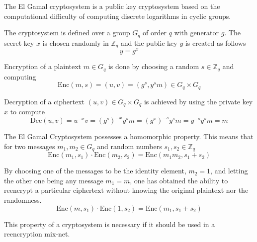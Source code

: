 The El Gamal cryptosystem is a public key cryptosystem based on the
computational difficulty of computing discrete logarithms in cyclic
groups. 

The cryptosystem is defined over a group $G_q$ of order $q$ with
generator $g$. The secret key $x$ is chosen randomly in $\mathbb{Z}_q$
and the public key $y$ is created as follows
$$
y = g^x
$$

Encryption of a plaintext $m \in G_q$ is done by choosing a random $s
\in \mathbb{Z}_q$ and computing
$$
\mathrm{Enc}(m,s) = (u,v) = (g^s, y^sm) \in G_q \times G_q
$$

Decryption of a ciphertext $(u,v) \in G_q \times G_q$ is achieved by
using the private key $x$ to compute
$$ 
\mathrm{Dec}(u,v) = u^{-x}v = (g^s)^{-x}y^sm = (g^x)^{-s}y^sm = y^{-s}y^sm = m
$$

The El Gamal Cryptosystem possesses a homomorphic property. This means
that for two messages $m_1,m_2 \in G_q$ and random numbers $s_1, s_2
\in \mathbb{Z}_q$
$$
\mathrm{Enc}(m_1,s_1) \cdot \mathrm{Enc}(m_2,s_2) = \mathrm{Enc}(m_1m_2,s_1 + s_2)
$$

By choosing one of the messages to be the identity element, $m_2 = 1$,
and letting the other one being any message $m_1 = m$, one has
obtained the ability to reencrypt a particular ciphertext without
knowing the original plaintext nor the randomness. 
$$
\mathrm{Enc}(m,s_1) \cdot \mathrm{Enc}(1,s_2) = \mathrm{Enc}(m_1, s_1 + s_2)
$$

This property of a cryptosystem is necessary if it should be used in a
reencryption mix-net.


\begin{center}
\end{center}
